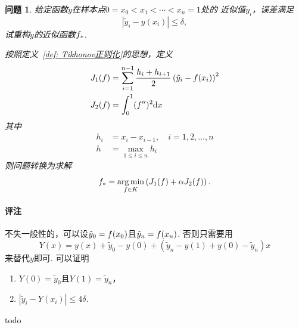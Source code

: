 \documentclass[12pt, a4paper]{article}
\theoremstyle{margin}
\newtheorem{prob}[thm]{问题}
\newcommand{\pr}{\prime}
\DeclareMathOperator*{\agm}{arg\,min}
\newcommand{\f}{\mathnormal{f}}
\newcommand{\rd}{\mathrm{d}}
\newcommand\defref[1]{定义~\ref{#1}}
\newcommand{\remark}{\paragraph{评注}}
\begin{document}
  \begin{prob}
    给定函数$y$在样本点$0=x_0 < x_1 < \cdots < x_n = 1$处的
    近似值$\tilde{y}_i$，误差满足
    \[
      |\tilde{y}_i - y(x_i)| \le \delta,
    \]
    试重构$y$的近似函数$\f_*$.\par
    按照\defref{def: Tikhonov正则化}的思想，定义
    \[\begin{split}
      J_1(\f) &= \sum_{i=1}^{n-1}\frac{h_i+h_{i+1}}{2}
      \left( \tilde{y}_i - \f(x_i) \right)^2 \\
      J_2(\f) &= \int_0^1 (\f^{\pr\pr})^2\rd x
    \end{split}\]
    其中
    \[\begin{split}
      h_i &= x_i - x_{i-1},\quad i = 1,2,\dots,n\\
      h &= \max_{1\le i\le n}h_i
    \end{split}\]
    则问题转换为求解
    \begin{equation}
      \label{equ: 正则化曲线拟合}
      \f_* = \agm_{\f\in K}\left( J_1(\f) + \alpha J_2(\f) \right).
    \end{equation}
  \end{prob}
  \remark
    不失一般性的，可以设$\tilde{y}_0 = \f(x_0)$且$\tilde{y}_n=\f(x_n)$.
    否则只需要用
    \[
      Y(x) = y(x)+\tilde{y}_0-y(0)+(\tilde{y}_n-y(1)+y(0)-\tilde{y}_n)x
    \]
    来替代$y$即可. 可以证明
    \begin{enumerate}
      \item $Y(0) = \tilde{y}_0$且$Y(1) = \tilde{y}_n$，
      \item $|\tilde{y}_i - Y(x_i)| \le 4\delta$.
    \end{enumerate}
    todo
\end{document}
